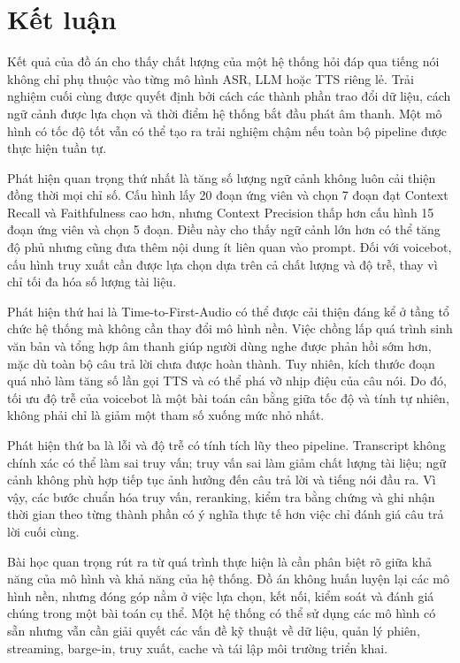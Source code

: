 \documentclass[a4paper,13pt,twoside]{report}
\begin{document}
\section{Kết luận}

Kết quả của đồ án cho thấy chất lượng của một hệ thống hỏi đáp qua tiếng nói không chỉ phụ thuộc vào từng mô hình ASR, LLM hoặc TTS riêng lẻ. Trải nghiệm cuối cùng được quyết định bởi cách các thành phần trao đổi dữ liệu, cách ngữ cảnh được lựa chọn và thời điểm hệ thống bắt đầu phát âm thanh. Một mô hình có tốc độ tốt vẫn có thể tạo ra trải nghiệm chậm nếu toàn bộ pipeline được thực hiện tuần tự.

Phát hiện quan trọng thứ nhất là tăng số lượng ngữ cảnh không luôn cải thiện đồng thời mọi chỉ số. Cấu hình lấy 20 đoạn ứng viên và chọn 7 đoạn đạt Context Recall và Faithfulness cao hơn, nhưng Context Precision thấp hơn cấu hình 15 đoạn ứng viên và chọn 5 đoạn. Điều này cho thấy ngữ cảnh lớn hơn có thể tăng độ phủ nhưng cũng đưa thêm nội dung ít liên quan vào prompt. Đối với voicebot, cấu hình truy xuất cần được lựa chọn dựa trên cả chất lượng và độ trễ, thay vì chỉ tối đa hóa số lượng tài liệu.

Phát hiện thứ hai là Time-to-First-Audio có thể được cải thiện đáng kể ở tầng tổ chức hệ thống mà không cần thay đổi mô hình nền. Việc chồng lấp quá trình sinh văn bản và tổng hợp âm thanh giúp người dùng nghe được phản hồi sớm hơn, mặc dù toàn bộ câu trả lời chưa được hoàn thành. Tuy nhiên, kích thước đoạn quá nhỏ làm tăng số lần gọi TTS và có thể phá vỡ nhịp điệu của câu nói. Do đó, tối ưu độ trễ của voicebot là một bài toán cân bằng giữa tốc độ và tính tự nhiên, không phải chỉ là giảm một tham số xuống mức nhỏ nhất.

Phát hiện thứ ba là lỗi và độ trễ có tính tích lũy theo pipeline. Transcript không chính xác có thể làm sai truy vấn; truy vấn sai làm giảm chất lượng tài liệu; ngữ cảnh không phù hợp tiếp tục ảnh hưởng đến câu trả lời và tiếng nói đầu ra. Vì vậy, các bước chuẩn hóa truy vấn, reranking, kiểm tra bằng chứng và ghi nhận thời gian theo từng thành phần có ý nghĩa thực tế hơn việc chỉ đánh giá câu trả lời cuối cùng.

Bài học quan trọng rút ra từ quá trình thực hiện là cần phân biệt rõ giữa khả năng của mô hình và khả năng của hệ thống. Đồ án không huấn luyện lại các mô hình nền, nhưng đóng góp nằm ở việc lựa chọn, kết nối, kiểm soát và đánh giá chúng trong một bài toán cụ thể. Một hệ thống có thể sử dụng các mô hình có sẵn nhưng vẫn cần giải quyết các vấn đề kỹ thuật về dữ liệu, quản lý phiên, streaming, barge-in, truy xuất, cache và tái lập môi trường triển khai.
\end{document}
